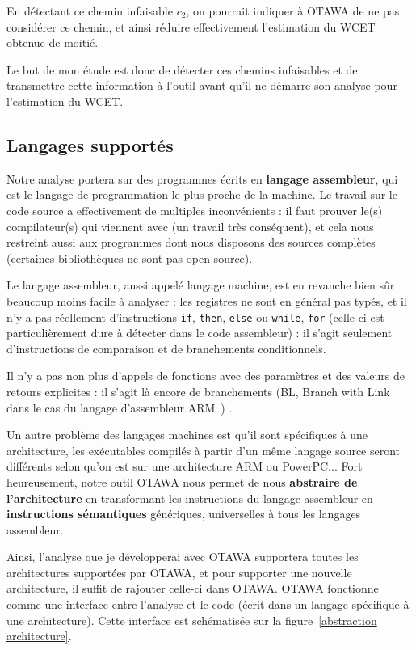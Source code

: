 \documentclass[french]{article}
\newcommand\ccc[1]{\color{red}{#1}\color{black}}
\begin{document}
  En détectant ce chemin infaisable $c_2$, on pourrait indiquer à OTAWA de ne pas considérer ce chemin, et ainsi réduire effectivement l'estimation du WCET obtenue de moitié.

  Le but de mon étude est donc de détecter ces chemins infaisables et de transmettre cette information à l'outil avant qu'il ne démarre son analyse pour l'estimation du WCET.


  \subsection{Langages supportés}
  Notre analyse portera sur des programmes écrits en \textbf{langage assembleur}, qui est le langage de programmation le plus proche de la machine. Le travail sur le code source a effectivement de multiples inconvénients : il faut prouver le(s) compilateur(s) qui viennent avec (un travail très conséquent), et cela nous restreint aussi aux programmes dont nous disposons des sources complètes (certaines bibliothèques ne sont pas open-source).

  Le langage assembleur, aussi appelé langage machine, est en revanche bien sûr beaucoup moins facile à analyser : les registres ne sont en général pas typés, et il n'y a pas réellement d'instructions \texttt{if}, \texttt{then}, \texttt{else} ou \texttt{while}, \texttt{for} (celle-ci est particulièrement dure à détecter dans le code assembleur) : il s'agit seulement d'instructions de comparaison et de branchements conditionnels.

  Il n'y a pas non plus d'appels de fonctions avec des paramètres et des valeurs de retours explicites : il s'agit là encore de branchements (BL, Branch with Link dans le cas du langage d'assembleur ARM~\cite{ARM instruction set}) \ccc{et on utilise un mélange de registres et de valeurs empilées pour les entrées et sorties de valeurs}.

  Un autre problème des langages machines est qu'il sont spécifiques à une architecture, les exécutables compilés à partir d'un même langage source seront différents selon qu'on est sur une architecture ARM ou PowerPC... Fort heureusement, notre outil OTAWA nous permet de nous \textbf{abstraire de l'architecture} en transformant les instructions du langage assembleur en \textbf{instructions sémantiques} génériques, universelles à tous les langages assembleur. %

  Ainsi, l'analyse que je développerai avec OTAWA supportera toutes les architectures supportées par OTAWA, et pour supporter une nouvelle architecture, il suffit de rajouter celle-ci dans OTAWA. OTAWA fonctionne comme une interface entre l'analyse et le code (écrit dans un langage spécifique à une architecture). Cette interface est schématisée sur la figure~\ref{abstraction architecture}.
\end{document}
